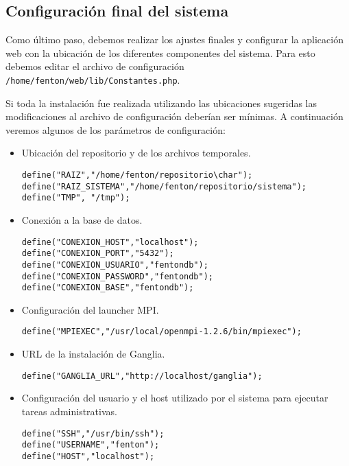 \documentclass[a4paper,10pt,spanish]{article}
\begin{document}
\subsection{Configuraci\'{o}n final del sistema}

Como \'{u}ltimo paso, debemos realizar los ajustes finales y configurar la aplicaci\'{o}n web con la ubicaci\'{o}n de los diferentes componentes del sistema. Para esto debemos editar el archivo de configuraci\'{o}n \mbox{\texttt{/home/fenton/web/lib/Constantes.php}}.

Si toda la instalaci\'{o}n fue realizada utilizando las ubicaciones sugeridas las modificaciones al archivo de configuraci\'{o}n deber\'{i}an ser m\'{i}nimas. A continuaci\'{o}n veremos algunos de los par\'{a}metros de configuraci\'{o}n:

\begin{itemize}
\item Ubicaci\'{o}n del repositorio y de los archivos temporales.
\begin{verbatim}
define("RAIZ","/home/fenton/repositorio\char");
define("RAIZ_SISTEMA","/home/fenton/repositorio/sistema");
define("TMP", "/tmp");
\end{verbatim}

\item Conexi\'{o}n a la base de datos.
\begin{verbatim}
define("CONEXION_HOST","localhost");
define("CONEXION_PORT","5432");
define("CONEXION_USUARIO","fentondb");
define("CONEXION_PASSWORD","fentondb");
define("CONEXION_BASE","fentondb");
\end{verbatim}

\item Configuraci\'{o}n del launcher MPI.
\begin{verbatim}
define("MPIEXEC","/usr/local/openmpi-1.2.6/bin/mpiexec");
\end{verbatim}

\item URL de la instalaci\'{o}n de Ganglia.
\begin{verbatim}
define("GANGLIA_URL","http://localhost/ganglia");
\end{verbatim}

\item Configuraci\'{o}n del usuario y el host utilizado por el sistema para ejecutar tareas administrativas.
\begin{verbatim}
define("SSH","/usr/bin/ssh"); 
define("USERNAME","fenton"); 
define("HOST","localhost");
\end{verbatim}


\end{itemize}
\end{document}
